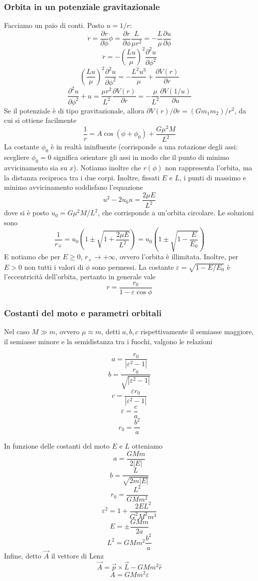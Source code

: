 \documentclass[a4paper,11pt]{article}
\begin{document}
\subsubsection{Orbita in un potenziale gravitazionale}
Facciamo un paio di conti. Posto $u=1/r$:
$$\dot{r}=\frac{\partial r}{\partial \phi}\dot{\phi}=\frac{\partial r}{\partial\phi}\frac{L}{\mu r^2}=-\frac{L}{\mu}\frac{\partial u}{\partial\phi}$$
$$\ddot{r}=-\left(\frac{Lu}{\mu}\right)^2\frac{\partial^2u}{\partial\phi^2}$$
$$\left(\frac{Lu}{\mu}\right)^2\frac{\partial^2u}{\partial\phi^2}=-\frac{L^2u^3}{\mu}+\frac{\partial V(r)}{\partial r}$$
$$\frac{\partial^2u}{\partial\phi^2}+u=\frac{\mu r^2}{L^2}\frac{\partial V(r)}{\partial r}=-\frac{\mu}{L^2}\frac{\partial V(1/u)}{\partial u}$$
Se il potenziale è di tipo gravitazionale, allora $\partial V(r)/\partial r=(Gm_1m_2)/r^2$, da cui si ottiene facilmente
$$\frac{1}{r}=A\cos(\phi+\phi_0)+\frac{G\mu^2M}{L^2}$$
La costante $\phi_0$ è in realtà ininfluente (corrisponde a una rotazione degli assi: scegliere $\phi_0=0$ significa orientare gli assi in modo che il punto di minimo avvicinamento sia su $x$). Notiamo inoltre che $r(\phi)$ non rappresenta l'orbita, ma la distanza reciproca tra i due corpi. Inoltre, fissati $E$ e $L$, i punti di massimo e minimo avvicinamento soddisfano l'equazione 
$$u^2-2u_0u=\frac{2\mu E}{L^2}$$
dove si è posto $u_0=G\mu^2M/L^2$, che corrisponde a un'orbita circolare. Le soluzioni sono
$$\frac{1}{r_{\mp}}=u_0\left(1\pm\sqrt{1+\frac{2\mu E}{L^2}}\right)=u_0\left(1\pm\sqrt{1-\frac{E}{E_0}}\right)$$
E notiamo che per $E\geq0$, $r_+\to+\infty$, ovvero l'orbita è illimitata. Inoltre, per $E>0$ non tutti i valori di $\phi$ sono permessi. La costante $\varepsilon=\sqrt{1-E/E_0}$ è l'eccentricità dell'orbita, pertanto in generale vale
$$r=\frac{r_0}{1-\varepsilon\cos\phi}$$
\subsubsection{Costanti del moto e parametri orbitali}
Nel caso $M\gg m$, ovvero $\mu\approx m$, detti $a,b,c$ rispettivamente il semiasse maggiore, il semiasse minore e la semidistanza tra i fuochi, valgono le relazioni

	$$a=\frac{r_0}{|\varepsilon^2-1|}$$ 	$$b=\frac{r_0}{\sqrt{|\varepsilon^2-1|}}$$ 
	$$c=\frac{\varepsilon r_0}{|\varepsilon^2-1|}$$  	$$\varepsilon=\frac{c}{a}$$ 
	$$r_0=\frac{b^2}{a}$$ 
	


\noindent In funzione delle costanti del moto $E$ e $L$ otteniamo
$$a=\frac{GMm}{2|E|}$$
$$b=\frac{L}{\sqrt{2m|E|}}$$
$$r_0=\frac{L^2}{GMm^2}$$
$$\varepsilon^2=1+\frac{2EL^2}{G^2M^2m^3}$$
$$E=\pm\frac{GMm}{2a}$$
$$L^2=GMm^2\frac{b^2}{a}$$
Infine, detto $\vec{A}$ il vettore di Lenz
$$\vec{A}=\vec{p}\times\vec{L}-GMm^2\hat{r}$$
$$A=GMm^2\varepsilon$$
\end{document}
